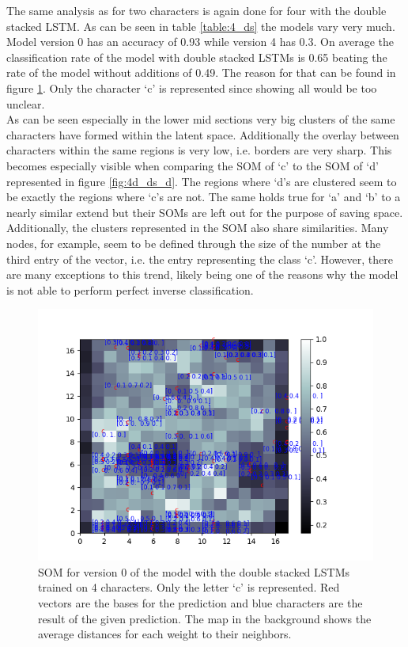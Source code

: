 The same analysis as for two characters is again done for four with the double stacked LSTM. As can be seen in table \ref{table:4_ds} the models vary very much. Model version 0 has an accuracy of 0.93 while version 4 has 0.3. On average the classification rate of the model with double stacked LSTMs is 0.65  beating the rate of the model without additions of 0.49. The reason for that can be found in figure \ref{fig:4d_ds_c}. Only the character `c' is represented since showing all would be too unclear. \\
As can be seen especially in the lower mid sections very big clusters of the same characters have formed within the latent space. Additionally the overlay between characters within the same regions is very low, i.e. borders are very sharp. This becomes especially visible when comparing the SOM of `c' to the SOM of `d' represented in figure \ref{fig:4d_ds_d}. The regions where `d's are clustered seem to be exactly the regions where `c's are not. The same holds true for `a' and `b' to a nearly similar extend but their SOMs are left out for the purpose of saving space. Additionally, the clusters represented in the SOM also share similarities. Many nodes, for example, seem to be defined through the size of the number at the third entry of the vector, i.e. the entry representing the class `c'. However, there are many exceptions to this trend, likely being one of the reasons why the model is not able to perform perfect inverse classification. 

\begin{figure}[!htb]
	\centering
	\includegraphics[width=\textwidth]{images/SOM_graphics/17x17_4d_ds_v0/c.png}
	\caption{SOM for version 0 of the model with the double stacked LSTMs trained on 4 characters. Only the letter `c' is represented. Red vectors are the bases for the prediction and blue characters are the result of the given prediction. The map in the background shows the average distances for each weight to their neighbors.}
	\label{fig:4d_ds_c}
\end{figure}

